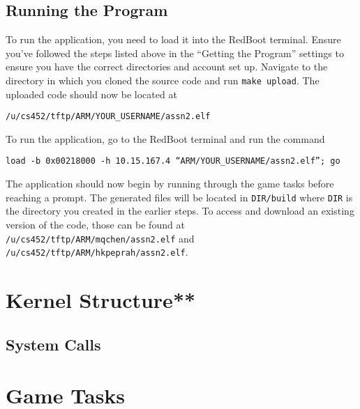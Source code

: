 \documentclass[12pt]{article}
\begin{document}
\subsection{Running the Program}
To run the application, you need to load it into the RedBoot terminal.  Ensure you've followed the steps listed above in the ``Getting the Program'' settings to ensure you have the correct directories and account set up.  Navigate to the directory in which you cloned the source code and run \texttt{make upload}.  The uploaded code should now be located at
\begin{center}
  \texttt{/u/cs452/tftp/ARM/YOUR\_USERNAME/assn2.elf}
\end{center}
To run the application, go to the RedBoot terminal and run the command
\begin{center}
  \texttt{load -b 0x00218000 -h 10.15.167.4 ``ARM/YOUR\_USERNAME/assn2.elf''; go}
\end{center}
The application should now begin by running through the game tasks before reaching a prompt.  The generated files will be located in \texttt{DIR/build} where \texttt{DIR} is the directory you created in the earlier steps.  To access and download an existing version of the code, those can be found at \texttt{/u/cs452/tftp/ARM/mqchen/assn2.elf} and \texttt{/u/cs452/tftp/ARM/hkpeprah/assn2.elf}.
\\[2\baselineskip]

\section{Kernel Structure**}
\subsection{System Calls}
\section{Game Tasks}
\end{document}
